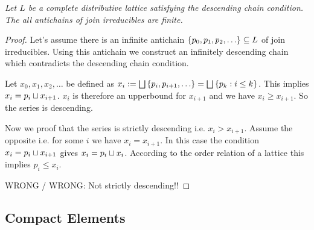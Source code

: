 \begin{theorem}
    \label{thmNoInfiniteAntichainJoinIrreducible}
    \emph{ Let $L$ be a complete distributive lattice satisfying the descending
    chain condition. The all antichains of join irreducibles are finite.}

    \begin{proof}
        Let's assume there is an infinite antichain $\left\{p_0, p_1, p_2,
        \ldots\right\} \subseteq L$ of join irreducibles. Using this antichain we
        construct an infinitely descending chain which contradicts the
        descending chain condition.

        Let $x_0, x_1, x_2, \ldots$ be defined as $x_i := \bigsqcup \left\{p_i, p_{i+1},
        \ldots\right\} = \bigsqcup \left\{p_k: i \le k\right\}$. This implies $x_i = p_i \sqcup
        x_{i+1}$. $x_i$ is therefore an upperbound for $x_{i+1}$ and we have
        $x_i \ge x_{i+1}$. So the series is descending.

        Now we proof that the series is strictly descending i.e. $x_i >
        x_{i+1}$. Assume the opposite i.e. for some $i$ we have $x_i = x_{i+1}$.
        In this case the condition $x_i = p_i \sqcup x_{i+1}$ gives $x_{i} = p_i
        \sqcup x_i$. According to the order relation of a lattice this implies
        $p_i \le x_{i}$.

        WRONG / WRONG: Not strictly descending!!
    \end{proof}
\end{theorem}






\subsection{Compact Elements}

